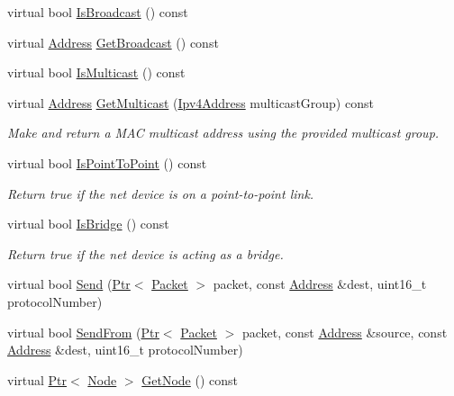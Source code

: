 \begin{DoxyCompactItemize}
\item 
virtual bool \hyperlink{classns3_1_1MeshPointDevice_a2a32c8d877db9e2f274737e953e2f98a}{Is\+Broadcast} () const 
\item 
virtual \hyperlink{classns3_1_1Address}{Address} \hyperlink{classns3_1_1MeshPointDevice_a08f693b1e5ff2a53aa492b5f43f92af0}{Get\+Broadcast} () const 
\item 
virtual bool \hyperlink{classns3_1_1MeshPointDevice_af2d877953e96024612cf665780a2422b}{Is\+Multicast} () const 
\item 
virtual \hyperlink{classns3_1_1Address}{Address} \hyperlink{classns3_1_1MeshPointDevice_a409a07386a7a32cd52c215df46abea1b}{Get\+Multicast} (\hyperlink{classns3_1_1Ipv4Address}{Ipv4\+Address} multicast\+Group) const 
\begin{DoxyCompactList}\small\item\em Make and return a M\+AC multicast address using the provided multicast group. \end{DoxyCompactList}\item 
virtual bool \hyperlink{classns3_1_1MeshPointDevice_aea8b732f32d3dd61ffd355e8bc479159}{Is\+Point\+To\+Point} () const 
\begin{DoxyCompactList}\small\item\em Return true if the net device is on a point-\/to-\/point link. \end{DoxyCompactList}\item 
virtual bool \hyperlink{classns3_1_1MeshPointDevice_a9c85129d18c5524c7a96ce33c13836e7}{Is\+Bridge} () const 
\begin{DoxyCompactList}\small\item\em Return true if the net device is acting as a bridge. \end{DoxyCompactList}\item 
virtual bool \hyperlink{classns3_1_1MeshPointDevice_aecb87304750f0d4e639907326e6681f0}{Send} (\hyperlink{classns3_1_1Ptr}{Ptr}$<$ \hyperlink{classns3_1_1Packet}{Packet} $>$ packet, const \hyperlink{classns3_1_1Address}{Address} \&dest, uint16\+\_\+t protocol\+Number)
\item 
virtual bool \hyperlink{classns3_1_1MeshPointDevice_ac82744797c666f7f55edbcfd8dcf27fb}{Send\+From} (\hyperlink{classns3_1_1Ptr}{Ptr}$<$ \hyperlink{classns3_1_1Packet}{Packet} $>$ packet, const \hyperlink{classns3_1_1Address}{Address} \&source, const \hyperlink{classns3_1_1Address}{Address} \&dest, uint16\+\_\+t protocol\+Number)
\item 
virtual \hyperlink{classns3_1_1Ptr}{Ptr}$<$ \hyperlink{classns3_1_1Node}{Node} $>$ \hyperlink{classns3_1_1MeshPointDevice_a77df4aa2db40d523b33037e8a00f7d70}{Get\+Node} () const 

\end{DoxyCompactItemize}
